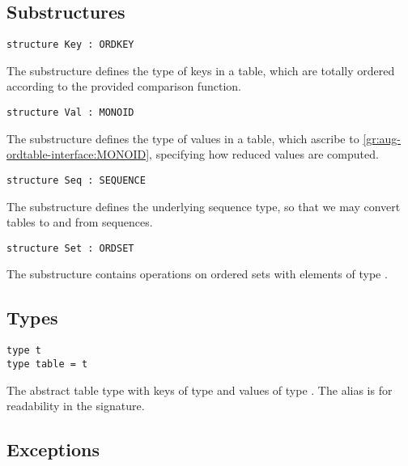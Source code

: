 \subsection{Substructures}

\begin{gram}[Key]
\begin{verbatim}
structure Key : ORDKEY
\end{verbatim}
The  substructure defines the type of keys in a table, which are
totally ordered according to the provided comparison function.
\end{gram}

\begin{gram}[Val]
\label{gr:aug-ordtable-interface:Val}
\begin{verbatim}
structure Val : MONOID
\end{verbatim}
The  substructure defines the type of values in a table, which
ascribe to \ref{gr:aug-ordtable-interface:MONOID}, specifying how reduced
values are computed.
\end{gram}

\begin{gram}[Seq]
\begin{verbatim}
structure Seq : SEQUENCE
\end{verbatim}
The  substructure defines the underlying sequence type, so that we
may convert tables to and from sequences.
\end{gram}

\begin{gram}[Set]
\begin{verbatim}
structure Set : ORDSET
\end{verbatim}
The  substructure contains operations on ordered sets with elements of
type .
\end{gram}


\subsection{Types}

\begin{gram}
\begin{verbatim}
type t
type table = t
\end{verbatim}
The abstract table type with keys of type  and values of type
. The alias  is for readability in the signature.
\end{gram}


\subsection{Exceptions}

